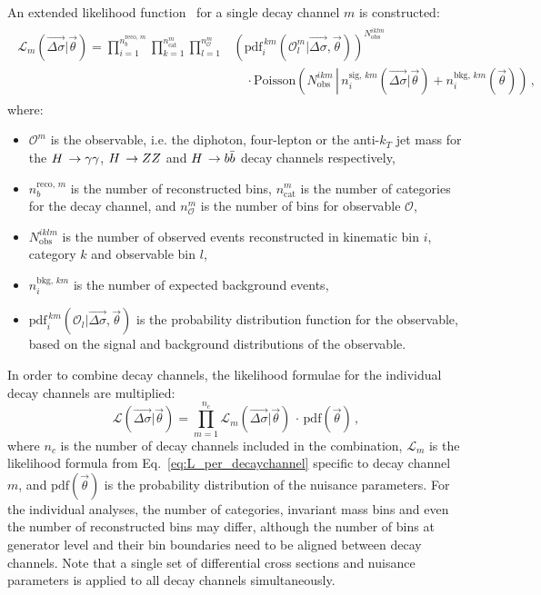 An extended likelihood function~\cite{Cowan:2010js} for a single decay channel $m$ is constructed:
% 
\begin{align}
\begin{split}
\mathcal{L}_m(\vec{\Delta\sigma} | \vec{\theta}) =
    \prod_{i=1}^{n_b^{\text{reco},\,m}}
    \prod_{k=1}^{n_\text{cat}^m}
    \prod_{l=1}^{n_\mathcal{O}^m}
        &
        \left(
        \text{pdf}_i^{\,km}(\mathcal{O}_l^m | \vec{\Delta\sigma}, \vec{\theta})
        \right)^{ N_\text{obs}^{iklm} }
        \\
        & \quad \cdot
        \text{Poisson}\left(
            N_\text{obs}^{ikm}
            \, \left| \,
            n_i^{\text{sig},\,km}(\vec{\Delta\sigma} | \vec{\theta})
            + n^{\text{bkg},\,km}_i(\vec{\theta})
            \right)\right.
\,,
\label{eq:L_per_decaychannel}
\end{split}
\end{align}
% 
where:
% 
\begin{itemize}
% 
\item $\mathcal{O}^m$ is the observable, i.e. the diphoton, four-lepton or the anti-$k_T$ jet mass for the $H\,\to\gamma\gamma$, $H\,\to ZZ$ and $H\,\to b\bar{b}$ decay channels respectively,
% 
\item $n_b^{\text{reco},\,m}$ is the number of reconstructed bins,
$n_\text{cat}^m$ is the number of categories for the decay channel,
and $n_\mathcal{O}^m$ is the number of bins for observable $\mathcal{O}$,
% 
\item $N_\text{obs}^{iklm}$ is the number of observed events reconstructed in kinematic bin $i$, category $k$ and observable bin $l$,
% 
\item $n^{\text{bkg},\,km}_i$ is the number of expected background events,
% 
\item $\text{pdf}_i^{\,km}(\mathcal{O}_l | \vec{\Delta\sigma}, \vec{\theta})$ is the probability distribution function for the observable, based on the signal and background distributions of the observable.
% 
\end{itemize}
% 
In order to combine decay channels, the likelihood formulae for the individual decay channels are multiplied:
% 
\begin{equation}
\mathcal{L}(\vec{\Delta\sigma} | \vec{\theta})
= \prod_{m=1}^{n_c} \mathcal{L}_m(\vec{\Delta\sigma} | \vec{\theta})
    \,\cdot\,
    \text{pdf}(\vec{\theta})
\,,
\end{equation}
% 
where $n_c$ is the number of decay channels included in the combination, $\mathcal{L}_m$ is the likelihood formula from Eq.~\ref{eq:L_per_decaychannel} specific to decay channel $m$, and $\text{pdf}(\vec{\theta})$ is the probability distribution of the nuisance parameters.
% 
For the individual analyses, the number of categories, invariant mass bins and even the number of reconstructed bins may differ, although the number of bins at generator level and their bin boundaries need to be aligned between decay channels.
% 
Note that a single set of differential cross sections and nuisance parameters is applied to all decay channels simultaneously.


